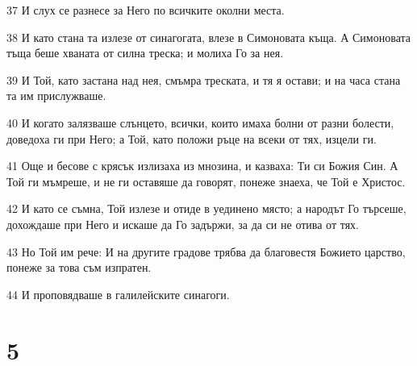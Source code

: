 \par 37 И слух се разнесе за Него по всичките околни места.
\par 38 И като стана та излезе от синагогата, влезе в Симоновата къща. А Симоновата тъща беше хваната от силна треска; и молиха Го за нея.
\par 39 И Той, като застана над нея, смъмра треската, и тя я остави; и на часа стана та им прислужваше.
\par 40 И когато залязваше слънцето, всички, които имаха болни от разни болести, доведоха ги при Него; а Той, като положи ръце на всеки от тях, изцели ги.
\par 41 Още и бесове с крясък излизаха из мнозина, и казваха: Ти си Божия Син. А Той ги мъмреше, и не ги оставяше да говорят, понеже знаеха, че Той е Христос.
\par 42 И като се съмна, Той излезе и отиде в уединено място; а народът Го търсеше, дохождаше при Него и искаше да Го задържи, за да си не отива от тях.
\par 43 Но Той им рече: И на другите градове трябва да благовестя Божието царство, понеже за това съм изпратен.
\par 44 И проповядваше в галилейските синагоги.

\chapter{5}


